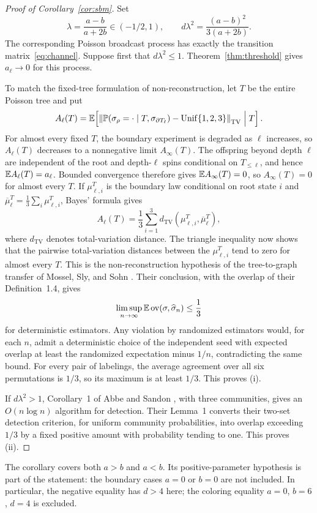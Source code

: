 \begin{proof}[Proof of Corollary~\ref{cor:sbm}]
Set
\[
 \lambda=\frac{a-b}{a+2b}\in(-1/2,1),\qquad
 d\lambda^2=\frac{(a-b)^2}{3(a+2b)}.
\]
The corresponding Poisson broadcast process has exactly the transition
matrix~\eqref{eq:channel}. Suppose first that $d\lambda^2\le1$.
Theorem~\ref{thm:threshold} gives $a_\ell\to0$ for this process.

To match the fixed-tree formulation of non-reconstruction, let $T$ be
the entire Poisson tree and put
\[
 A_\ell(T)=\mathbb E\!\left[
 \left\|\mathbb P(\sigma_\rho=\cdot\mid T,\sigma_{\partial T_\ell})
       -\operatorname{Unif}\{1,2,3\}\right\|_{\mathrm{TV}}
 \mathrel{\Big|}T\right].
\]
For almost every fixed $T$, the boundary experiment is degraded as $\ell$
increases, so $A_\ell(T)$ decreases to a nonnegative limit $A_\infty(T)$.
The offspring beyond depth $\ell$ are independent of the root and
depth-$\ell$ spins conditional on $T_{\le\ell}$, and hence
$\mathbb E A_\ell(T)=a_\ell$. Bounded convergence therefore gives
$\mathbb E A_\infty(T)=0$, so $A_\infty(T)=0$ for almost every $T$.
If $\mu_{\ell,i}^T$ is the boundary law conditional on root state $i$
and $\overline\mu_\ell^T=\frac13\sum_i\mu_{\ell,i}^T$, Bayes' formula gives
\[
 A_\ell(T)=\frac13\sum_{i=1}^3
   d_{\mathrm{TV}}(\mu_{\ell,i}^T,\overline\mu_\ell^T),
\]
where $d_{\mathrm{TV}}$ denotes total-variation distance. The triangle inequality now shows that the pairwise total-variation
distances between the $\mu_{\ell,i}^T$ tend to zero for almost every $T$.
This is the non-reconstruction hypothesis of the tree-to-graph transfer
of Mossel, Sly, and Sohn \cite[Theorem~2.1]{MosselSlySohn2025}.
Their conclusion, with the overlap of their Definition~1.4, gives
\[
 \limsup_{n\to\infty}\mathbb E\operatorname{ov}(\sigma,\widehat\sigma_n)\le\frac13
\]
for deterministic estimators. Any violation by randomized estimators would,
for each $n$, admit a deterministic choice of the independent seed with
expected overlap at least the randomized expectation minus $1/n$,
contradicting the same bound. For every pair of labelings, the average
agreement over all six permutations is $1/3$, so its maximum is at least
$1/3$. This proves (i).

If $d\lambda^2>1$, Corollary~1 of Abbe and Sandon
\cite{AbbeSandon2018}, with three communities, gives an $O(n\log n)$
algorithm for detection. Their Lemma~1 converts their two-set detection
criterion, for uniform community probabilities, into overlap exceeding
$1/3$ by a fixed positive amount with probability tending to one.
This proves (ii).
\end{proof}

The corollary covers both $a>b$ and $a<b$. Its positive-parameter
hypothesis is part of the statement: the boundary cases $a=0$ or $b=0$
are not included. In particular, the negative equality has $d>4$ here;
the coloring equality $a=0$, $b=6$, $d=4$ is excluded.


